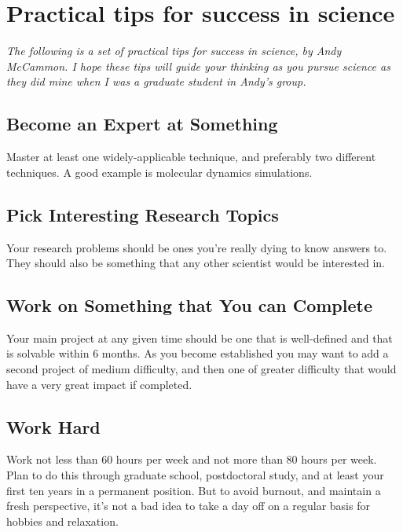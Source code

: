 \documentclass[12pt]{article}
\begin{document}
\newpage

\section{Practical tips for success in science}\label{sec:practical-tips}

\textit{The following is a set of practical tips for success in science, by Andy McCammon.
  I hope these tips will guide your thinking as you pursue science as they did mine when I was a graduate student in Andy's group.
}

\subsection*{Become an Expert at Something}

Master at least one widely-applicable technique, and preferably two different techniques.
A good example is molecular dynamics simulations.

\subsection*{Pick Interesting Research Topics}

Your research problems should be ones you're really dying to know answers to.
They should also be something that any other scientist would be interested in.

\subsection*{Work on Something that You can Complete}

Your main project at any given time should be one that is well-defined and that is solvable within 6 months.
As you become established you may want to add a second project of medium difficulty, and then one of greater difficulty that would have a very great impact if completed.

\subsection*{Work Hard}

Work not less than 60 hours per week and not more than 80 hours per week.
Plan to do this through graduate school, postdoctoral study, and at least your first ten years in a permanent position.
But to avoid burnout, and maintain a fresh perspective, it's not a bad idea to take a day off on a regular basis for hobbies and relaxation.
\end{document}
